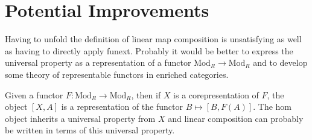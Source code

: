 \documentclass[12pt]{article} %
\theoremstyle{definition}
\theoremstyle{definition}
\theoremstyle{definition}
\theoremstyle{definition}
\begin{document}
\section{Potential Improvements}

Having to unfold the definition of linear map composition is unsatisfying as well as having to 
directly apply funext. Probably it would be better to express the universal property as 
a representation of a functor $\text{Mod}_R \to \text{Mod}_R$ and to develop some
theory of representable functors in enriched categories.

Given a functor $F : \text{Mod}_R \to \text{Mod}_R$, then if $X$ is a corepresentation of $F$,
the object $[X, A]$ is a representation of the functor $B \mapsto [B, F(A)]$. The hom object 
inherits a universal property from $X$ and linear composition can probably be written in terms of this 
universal property.











  
\end{document}
